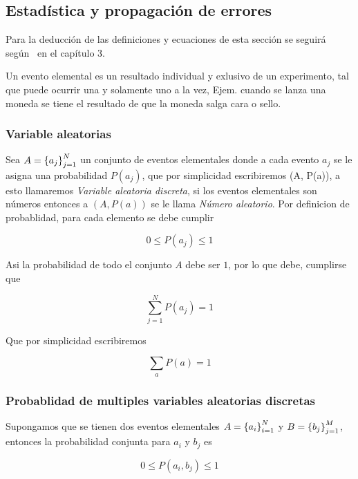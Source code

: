 \subsection{Estadística y propagación de errores}
Para la deducción de las definiciones y ecuaciones de esta sección se seguirá
según~\cite{swendsen2012introduction} en el capítulo 3.

Un evento elemental es un resultado individual y exlusivo de un experimento, tal
que puede ocurrir una y solamente uno a la vez, Ejem. cuando se lanza una
moneda se tiene el resultado de que la moneda salga cara o sello.

\subsubsection{Variable aleatorias}
Sea $A = \left\{a_j\right\}_{j = 1}^N$ un conjunto de eventos elementales donde a cada
evento $a_j$ se le asigna una probabilidad $P(a_j)$, que por
simplicidad escribiremos (A, P(a)), a esto llamaremos
\textit{Variable aleatoria discreta}, si los eventos elementales son
números entonces a $(A, P(a))$ se le llama \textit{Número aleatorio}.
Por definicion de probablidad, para cada elemento se debe cumplir

\begin{equation}
  0 \leq P(a_j) \leq 1
  \label{eq:prob-elemental}
\end{equation}

Asi la probabilidad de todo el conjunto $A$ debe ser $1$, por lo que
debe, cumplirse
que

\begin{equation}
  \sum_{j = 1}^N P(a_j) = 1
  \label{eq:prob-total}
\end{equation}

Que por simplicidad escribiremos

\begin{equation}
  \sum_{a} P(a) = 1
  \label{eq:prob-total-sim}
\end{equation}

\subsubsection{Probablidad de multiples variables aleatorias discretas}
Supongamos que se tienen dos eventos elementales
$A=\left\{a_i\right\}_{i=1}^N$ y $B=\left\{b_j\right\}_{j=1}^M$,
entonces la probabilidad conjunta para $a_i$ y $b_j$ es

\begin{equation}
  0 \leq P(a_i, b_j) \leq 1
  \label{eq:prob-conjunta}
\end{equation}

